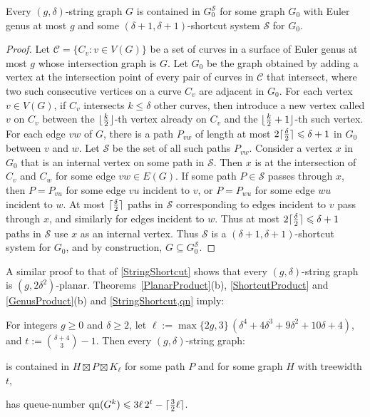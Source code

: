\documentclass{patmorin}
\DeclareMathOperator{\qn}{qn}
\DeclarePairedDelimiter{\ceil}{\lceil}{\rceil}
\DeclarePairedDelimiter{\floor}{\lfloor}{\rfloor}
\renewcommand{\SS}{\mathcal{S}}
\renewcommand{\geq}{\geqslant}
\renewcommand{\leq}{\leqslant}
\begin{document}
\begin{lem}
\label{StringShortcut}
Every $(g,\delta)$-string graph $G$ is contained in $G_0^\SS$ for some graph $G_0$ with Euler genus at most $g$ and some $(\delta+1,\delta+1 )$-shortcut system $\SS$ for $G_0$.
\end{lem}

\begin{proof}
Let $\mathcal{C}=\{C_v:v\in V(G)\}$ be a set of curves in a surface of Euler genus at most $g$ whose intersection graph is $G$.  Let $G_0$ be the graph obtained by adding a vertex at the intersection point of every pair of curves in $\mathcal{C}$ that intersect,  where two such consecutive vertices on a curve $C_v$ are adjacent in $G_0$. For each vertex $v\in V(G)$, if $C_v$ intersects $k\leq\delta$ other curves, then introduce a new vertex called $v$ on $C_v$ between the
$\floor{\frac{k}{2}}$-th vertex already on $C_v$ and the $\floor{\frac{k}{2}+1}$-th such vertex. For each edge $vw$ of $G$, there is a path $P_{vw}$ of length at most $2\ceil{\frac{\delta}{2}}\leq \delta+1$ in $G_0$ between $v$ and $w$. Let $\SS$ be the set of all such paths $P_{vw}$. Consider a vertex $x$ in $G_0$ that is an internal vertex on some path in $\SS$. Then $x$ is at the intersection of $C_v$ and $C_w$ for some edge $vw\in E(G)$. If some path $P\in \SS$ passes through $x$, then $P=P_{vu}$ for some edge $vu$ incident to $v$, or $P=P_{wu}$ for some edge $wu$ incident to $w$. At most $\ceil{\frac{\delta}{2}}$ paths in $\SS$ corresponding to edges incident to $v$ pass through $x$, and similarly for edges incident to $w$. Thus at most $2\ceil{\frac{\delta}{2}}\leq\delta+1$ paths in $\SS$ use $x$ as an internal vertex. Thus $\SS$ is a $(\delta+1,\delta+1)$-shortcut system for $G_0$, and by construction, $G \subseteq G_0^\SS$.
\end{proof}

A similar proof to that of \cref{StringShortcut} shows that every $(g,\delta)$-string graph is $(g,2\delta^2)$-planar. Theorems~\ref{PlanarProduct}(b), \ref{ShortcutProduct}  and \ref{GenusProduct}(b) and \cref{StringShortcut,qn} imply:

\begin{thm}
\label{StringPartition}
For integers $g\geq 0$ and $\delta\geq 2$, let $\ell:= \max\{2g,3\} \,(\delta^4 + 4 \delta^3 + 9 \delta^2 + 10 \delta + 4)$,
and $t:= \binom{ \delta+4}{3}-1$.
Then  every $(g,\delta)$-string graph:
\begin{compactitem}
	\item is contained in $H\boxtimes P \boxtimes K_{\ell}$ for some path $P$ and for some graph $H$ with treewidth $t$,
	\item has queue-number $\qn(G^k) \leq 3 \ell \, 2^t - \ceil{\tfrac{3}{2}\ell}$.
\end{compactitem}
\end{thm}
\end{document}
